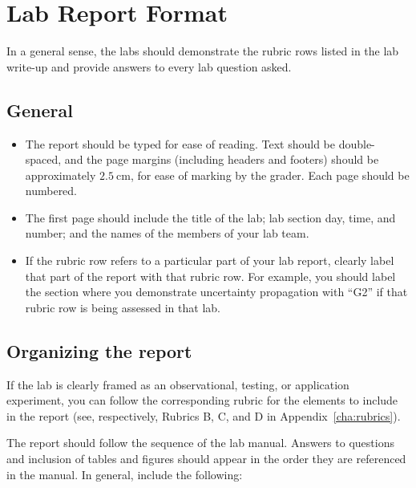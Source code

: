 \chapter{Lab Report Format}


In a general sense, the labs should demonstrate the rubric rows listed in the lab write-up and provide answers to every lab question asked.

\section{General}

\begin{itemize}
	\item The report should be typed for ease of reading. Text should be double-spaced, and the page margins (including headers and footers) should be approximately $2.5\:$cm, for ease of marking by the grader. Each page should be numbered.
	
	\item The first page should include the title of the lab; lab section day, time, and number; and the names of the members of your lab team.
	
	\item If the rubric row refers to a particular part of your lab report, clearly label that part of the report with that rubric row. For example, you should label the section where you demonstrate uncertainty propagation with ``G2'' if that rubric row is being assessed in that lab.
\end{itemize}

\section{Organizing the report}

If the lab is clearly framed as an observational, testing, or application experiment, you can follow the corresponding rubric for the elements to include in the report (see, respectively, Rubrics B, C, and D in Appendix~\ref{cha:rubrics}).

The report should follow the sequence of the lab manual. Answers to questions and inclusion of tables and figures should appear in the order they are referenced in the manual. In general, include the following:

